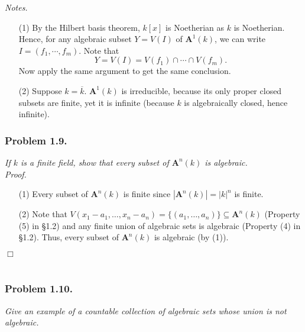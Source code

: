 \documentclass{article}
\begin{document}
\emph{Notes.}
\begin{enumerate}
\item[(1)]
  By the Hilbert basis theorem, $k[x]$ is Noetherian as $k$ is Noetherian.
  Hence, for any algebraic subset $Y = V(I)$ of $\mathbf{A}^1(k)$,
  we can write $I = (f_1, \cdots, f_m)$.
  Note that
  \[
    Y = V(I) = V(f_1) \cap \cdots \cap V(f_m).
  \]
  Now apply the same argument to get the same conclusion.

\item[(2)]
  Suppose $k = \overline{k}$.
  $\mathbf{A}^1(k)$ is irreducible, because its only proper closed subsets are finite,
  yet it is infinite
  (because $k$ is algebraically closed, hence infinite). \\
\end{enumerate}






\subsubsection*{Problem 1.9.}
\emph{If $k$ is a finite field, show that every subset of $\mathbf{A}^{n}(k)$ is algebraic.} \\

\emph{Proof.}
\begin{enumerate}
\item[(1)]
  Every subset of $\mathbf{A}^{n}(k)$ is finite since
  $|\mathbf{A}^{n}(k)| = |k|^n$ is finite.

\item[(2)]
  Note that $V(x_1-a_1,\ldots,x_n-a_n) = \{ (a_1,\ldots,a_n) \} \subseteq \mathbf{A}^{n}(k)$
  (Property (5) in \S 1.2)
  and any finite union of algebraic sets is algebraic (Property (4) in \S 1.2).
  Thus, every subset of $\mathbf{A}^{n}(k)$ is algebraic (by (1)).
\end{enumerate}
$\Box$ \\\\






\subsubsection*{Problem 1.10.}
\emph{Give an example of a countable collection of algebraic sets whose union is not
algebraic.} \\
\end{document}
